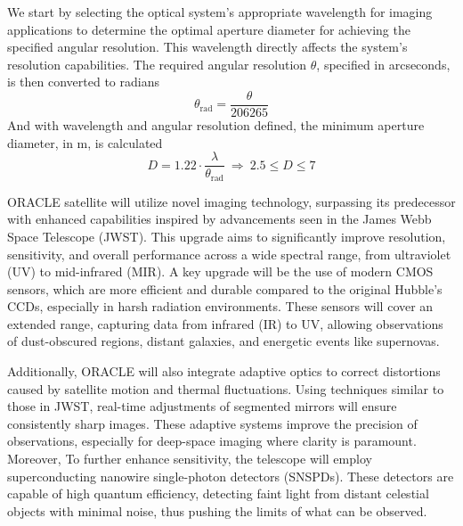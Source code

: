 We start by selecting the optical system's appropriate wavelength for imaging applications to determine the optimal aperture diameter for achieving the specified angular resolution. This wavelength directly affects the system’s resolution capabilities. The required angular resolution $\theta$, specified in arcseconds, is then converted to radians 
\begin{equation}
\theta_{\text{rad}} = \frac{\theta}{206265}
\end{equation}
And with wavelength and angular resolution defined, the minimum aperture diameter, in m, is calculated 
\begin{equation}
D = 1.22 \cdot \frac{\lambda}{\theta_{\text{rad}}} \ \Rightarrow \ 2.5\leq D\leq 7 
\end{equation}

\vspace{1.5mm}

ORACLE satellite will utilize novel imaging technology, surpassing its predecessor with enhanced capabilities inspired by advancements seen in the James Webb Space Telescope (JWST). This upgrade aims to significantly improve resolution, sensitivity, and overall performance across a wide spectral range, from ultraviolet (UV) to mid-infrared (MIR). A key upgrade will be the use of modern CMOS sensors, which are more efficient and durable compared to the original Hubble’s CCDs, especially in harsh radiation environments. These sensors will cover an extended range, capturing data from infrared (IR) to UV, allowing observations of dust-obscured regions, distant galaxies, and energetic events like supernovas.

\vspace{1.5mm}

 Additionally, ORACLE will also integrate adaptive optics to correct distortions caused by satellite motion and thermal fluctuations. Using techniques similar to those in JWST, real-time adjustments of segmented mirrors will ensure consistently sharp images. These adaptive systems improve the precision of observations, especially for deep-space imaging where clarity is paramount. Moreover, To further enhance sensitivity, the telescope will employ superconducting nanowire single-photon detectors (SNSPDs). These detectors are capable of high quantum efficiency, detecting faint light from distant celestial objects with minimal noise, thus pushing the limits of what can be observed.

 \vspace{1.5mm}

